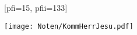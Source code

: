 [pfi={15}, pfii={133}]

\beginverse
\endverse
\texttt{[image: Noten/KommHerrJesu.pdf]}

\endsong

\beginscripture{}~\\
\endscripture